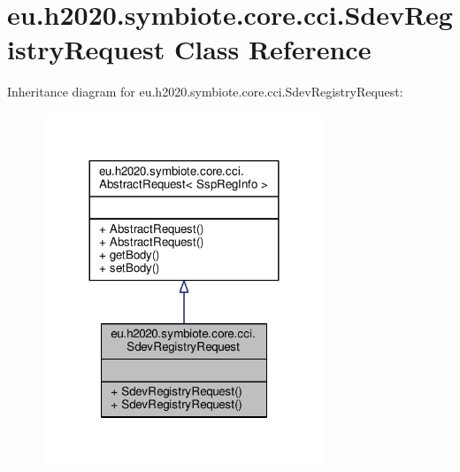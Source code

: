 \hypertarget{classeu_1_1h2020_1_1symbiote_1_1core_1_1cci_1_1SdevRegistryRequest}{}\section{eu.\+h2020.\+symbiote.\+core.\+cci.\+Sdev\+Registry\+Request Class Reference}
\label{classeu_1_1h2020_1_1symbiote_1_1core_1_1cci_1_1SdevRegistryRequest}


Inheritance diagram for eu.\+h2020.\+symbiote.\+core.\+cci.\+Sdev\+Registry\+Request\+:\nopagebreak
\begin{figure}[H]
\begin{center}
\leavevmode
\includegraphics[width=240pt]{classeu_1_1h2020_1_1symbiote_1_1core_1_1cci_1_1SdevRegistryRequest__inherit__graph}
\end{center}
\end{figure}


